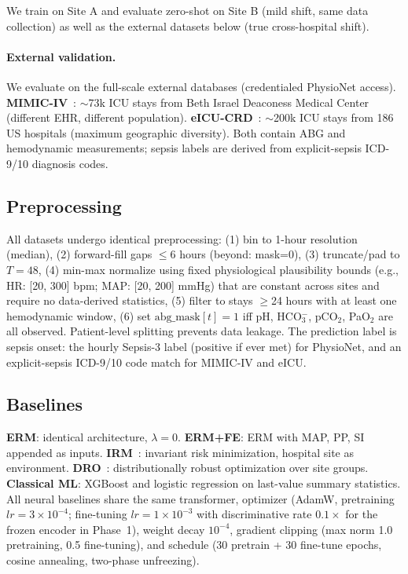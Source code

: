 \documentclass{article}
\begin{document}
We train on Site A and evaluate zero-shot on Site B (mild shift, same data collection) as well as the external datasets below (true cross-hospital shift).

\paragraph{External validation.}
We evaluate on the full-scale external databases (credentialed PhysioNet access).
\textbf{MIMIC-IV}~\citep{johnson2023mimic}: $\sim$73k ICU stays from Beth Israel Deaconess Medical Center (different EHR, different population).
\textbf{eICU-CRD}~\citep{pollard2018eicu}: $\sim$200k ICU stays from 186 US hospitals (maximum geographic diversity).
Both contain ABG and hemodynamic measurements; sepsis labels are derived from explicit-sepsis ICD-9/10 diagnosis codes.

\subsection{Preprocessing}

All datasets undergo identical preprocessing: (1) bin to 1-hour resolution (median), (2) forward-fill gaps $\leq$6 hours (beyond: mask=0), (3) truncate/pad to $T{=}48$, (4) min-max normalize using fixed physiological plausibility bounds (e.g., HR: [20, 300] bpm; MAP: [20, 200] mmHg) that are constant across sites and require no data-derived statistics, (5) filter to stays $\geq$24 hours with at least one hemodynamic window, (6) set $\text{abg\_mask}[t]{=}1$ iff pH, HCO$_3^-$, pCO$_2$, PaO$_2$ are all observed.
Patient-level splitting prevents data leakage. The prediction label is sepsis onset: the hourly Sepsis-3 label (positive if ever met) for PhysioNet, and an explicit-sepsis ICD-9/10 code match for MIMIC-IV and eICU.

\subsection{Baselines}

\textbf{ERM}: identical architecture, $\lambda{=}0$.
\textbf{ERM+FE}: ERM with MAP, PP, SI appended as inputs.
\textbf{IRM}~\citep{arjovsky2019invariant}: invariant risk minimization, hospital site as environment.
\textbf{DRO}~\citep{sagawa2020distributionally}: distributionally robust optimization over site groups.
\textbf{Classical ML}: XGBoost and logistic regression on last-value summary statistics.
All neural baselines share the same transformer, optimizer (AdamW, pretraining $lr{=}3{\times}10^{-4}$; fine-tuning $lr{=}1{\times}10^{-3}$ with discriminative rate $0.1{\times}$ for the frozen encoder in Phase~1), weight decay $10^{-4}$, gradient clipping (max norm 1.0 pretraining, 0.5 fine-tuning), and schedule (30 pretrain + 30 fine-tune epochs, cosine annealing, two-phase unfreezing).
\end{document}
